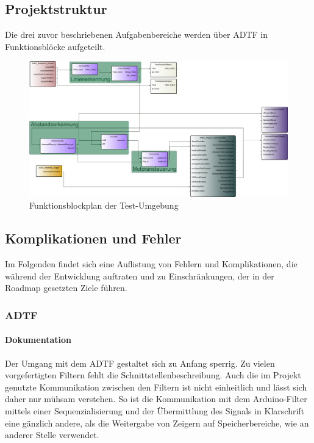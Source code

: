 \documentclass[12pt, a4paper]{scrartcl}
\begin{document}
\subsection{Projektstruktur}
Die drei zuvor beschriebenen Aufgabenbereiche werden über ADTF in Funktionsblöcke aufgeteilt.



\begin{figure}[ht]
	\centering
	\includegraphics[width=\textwidth, height=\textheight, keepaspectratio]{Bilder/FunktionsblockplanE.png}
	\caption{Funktionsblockplan der Test-Umgebung}
	\label{img:funktionsblockplan}
\end{figure}


\subsection{Komplikationen und Fehler}
Im Folgenden findet sich eine Auflistung von Fehlern und Komplikationen, die während der Entwicklung auftraten und zu Einschränkungen, der in der Roadmap gesetzten Ziele führen.

\subsubsection{ADTF}
\paragraph{Dokumentation}
Der Umgang mit dem ADTF gestaltet sich zu Anfang sperrig. Zu vielen vorgefertigten Filtern fehlt die Schnittstellenbeschreibung. Auch die im Projekt genutzte Kommunikation zwischen den Filtern ist nicht einheitlich und lässt sich daher nur mühsam verstehen. So ist die Kommunikation mit dem Arduino-Filter mittels einer Sequenzialisierung und der Übermittlung des Signals in Klarschrift eine gänzlich andere, als die Weitergabe von Zeigern auf Speicherbereiche, wie an anderer Stelle verwendet.
\end{document}
